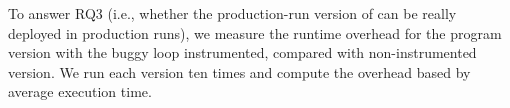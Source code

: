 To answer RQ3 (i.e., whether the production-run version of \Tool 
can be really deployed in production runs), 
we measure the runtime overhead for the program version 
with the buggy loop instrumented, compared with non-instrumented version. 
We run each version ten times and compute the overhead based by average execution time. 


